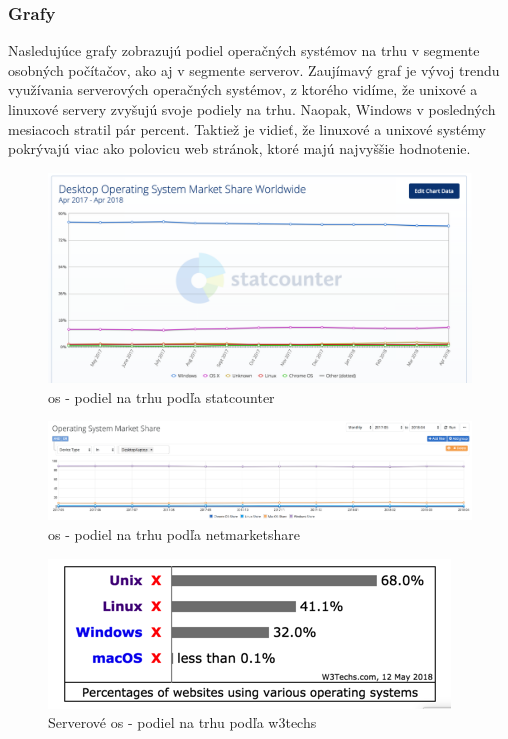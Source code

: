 \subsubsection{Grafy}
\indent Nasledujúce grafy zobrazujú podiel operačných systémov na trhu v segmente osobných počítačov, ako aj v segmente serverov. Zaujímavý graf je vývoj trendu využívania serverových operačných systémov, z ktorého vidíme, že unixové a linuxové servery zvyšujú svoje podiely na trhu. Naopak, Windows v posledných mesiacoch stratil pár percent. Taktiež je vidieť, že linuxové a unixové systémy pokrývajú viac ako polovicu web stránok, ktoré majú najvyššie hodnotenie.
\begin{figure}[!htbp]
	\centering
	\includegraphics[width=\linewidth]{img/statcounter.png}
	\caption{\acrshort{os} - podiel na trhu podľa statcounter\cite{statcounter}}
	\label{fig:test}
	
\end{figure}
\begin{figure}[!htbp]
	\centering
	\includegraphics[width=\linewidth]{img/netmarketshare.png}
	\caption{\acrshort{os} - podiel na trhu podľa netmarketshare\cite{netmarketshare}}
	\label{fig:test}
	
\end{figure}
\begin{figure}[!htbp]
	\centering
	\includegraphics[scale=0.4]{img/usg_server.png}
	\caption{Serverové \acrshort{os} - podiel na trhu podľa w3techs\cite{pop}}
	\label{fig:test}
	
\end{figure}
